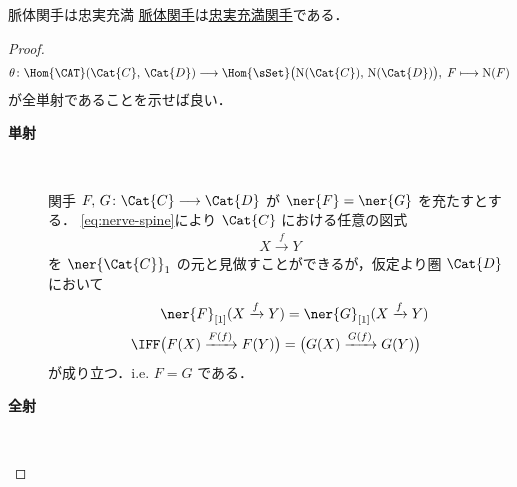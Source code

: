 \documentclass[TQFT_main]{subfiles}
\begin{document}
\begin{myprop}[label=prop:nerve]{脈体関手は忠実充満}
    \hyperref[def:nerve]{脈体関手}は\hyperref[def:faithful]{忠実充満関手}である．
\end{myprop}
\begin{proof}
    \begin{align}
        \theta \colon \Hom{\CAT}(\Cat{C},\, \Cat{D}) \lto \Hom{\sSet} \bigl( \mathrm{N}(\Cat{C}),\, \mathrm{N}(\Cat{D}) \bigr),\; F \lmto \mathrm{N}(F)
    \end{align}
    が全単射であることを示せば良い．

    \begin{description}
        \item[\textbf{単射}]　
        
        関手 $F,\, G \colon \Cat{C} \lto \Cat{D}$ が $\ner{F} = \ner{G}$ を充たすとする．
        \eqref{eq:nerve-spine}により $\Cat{C}$ における任意の図式
        \begin{align}
            X \xrightarrow{f} Y
        \end{align}
        を $\ner{\Cat{C}}_1$ の元と見做すことができるが，仮定より圏 $\Cat{D}$ において
        \begin{align}
            &\ner{F}_{[1]}(X \xrightarrow{f} Y) = \ner{G}_{[1]}(X \xrightarrow{f} Y) \\
            \IFF & \bigl(F(X) \xrightarrow{F(f)} F(Y)\bigr) =  \bigl(G(X) \xrightarrow{G(f)} G(Y)\bigr)
        \end{align}
        が成り立つ．i.e. $F = G$ である．
        \item[\textbf{全射}]　
        

\end{description}
\end{proof}
\end{document}
